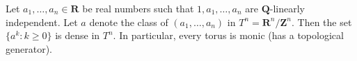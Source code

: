 Let $a_1, \ldots, a_n \in \mathbf{R}$ be real numbers such that $1, a_1, \ldots, a_n$ are $\mathbf{Q}$-linearly independent. Let $a$ denote the class of $(a_1, \ldots, a_n)$ in $T^n = \mathbf{R}^n / \mathbf{Z}^n$. Then the set $\{a^k : k \geq 0\}$ is dense in $T^n$. In particular, every torus is monic (has a topological generator).
